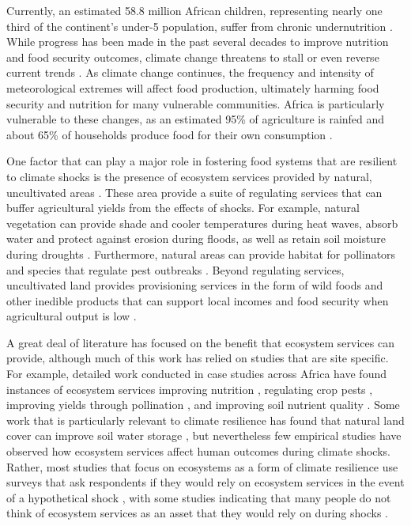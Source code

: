 \documentclass{article}
\begin{document}
Currently, an estimated 58.8 million African children, representing nearly one third of the continent's under-5 population, suffer from chronic undernutrition \cite{unicef2019}.  While progress has been made in the past several decades to improve nutrition and food security outcomes, climate change threatens to stall or even reverse current trends \cite{FAO2018}.  As climate change continues, the frequency and intensity of meteorological extremes will affect food production, ultimately harming food security and nutrition for many vulnerable communities.  Africa is particularly vulnerable to these changes, as an estimated 95\% of agriculture is rainfed \cite{Wani2009} and about 65\% of households produce food for their own consumption \cite{Runge2004}.

One factor that can play a major role in fostering food systems that are resilient to climate shocks is the presence of ecosystem services provided by natural, uncultivated areas \cite{Reed2016, Pascual2017, Daily2008}.  These area provide a suite of regulating services that can buffer agricultural yields from the effects of shocks.  For example, natural vegetation can provide shade and cooler temperatures during heat waves, absorb water and protect against erosion during floods, as well as retain soil moisture during droughts \cite{Siriri2013, Lott2009}.  Furthermore, natural areas can provide habitat for pollinators and species that regulate pest outbreaks \cite{Karp2013}.  Beyond regulating services, uncultivated land provides provisioning services in the form of wild foods and other inedible products that can support local incomes and food security when agricultural output is low \cite{friant2019life, morgan2020secret, powell2015improving, Assogbadjo2012}.

A great deal of literature has focused on the benefit that ecosystem services can provide, although much of this work has relied on studies that are site specific.  For example, detailed work conducted in case studies across Africa have found instances of ecosystem services improving nutrition \cite{Golden2011}, regulating crop pests \cite{Girma2000}, improving yields through pollination \cite{Gemmill-Herren2008, Munyuli2012}, and improving soil nutrient quality \cite{Sileshi2012, Boffa2000, Siriri2009}.  Some work that is particularly relevant to climate resilience has found that natural land cover can improve soil water storage \cite{Siriri2013, Lott2009}, but nevertheless few empirical studies have observed how ecosystem services affect human outcomes during climate shocks.  Rather, most studies that focus on ecosystems as a form of climate resilience use surveys that ask respondents if they would rely on ecosystem services in the event of a hypothetical shock \cite{Robledo2012}, with some studies indicating that many people do not think of ecosystem services as an asset that they would rely on during shocks \cite{Wunder2014}.
\end{document}
